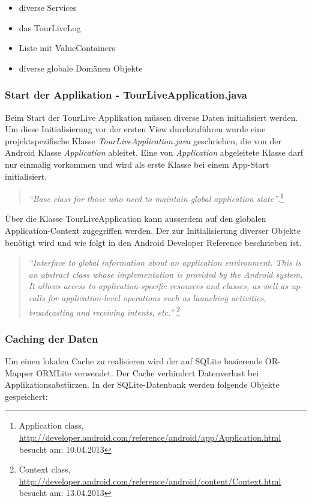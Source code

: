 \begin{itemize} [noitemsep,topsep=0pt]
	\item diverse Services
	\item das TourLiveLog
	\item Liste mit ValueContainers
	\item diverse globale Domänen Objekte
\end{itemize}

\subsubsection{Start der Applikation - TourLiveApplication.java}
Beim Start der TourLive Applikation müssen diverse Daten initialisiert werden. Um diese Initialisierung vor der ersten View durchzuführen wurde eine projektspezifische Klasse \textit{TourLiveApplication.java} geschrieben, die von der Android Klasse \textit{Application} ableitet. Eine von \textit{Application} abgeleitete Klasse darf nur einmalig vorkommen und wird als erste Klasse bei einem App-Start initialisiert.
\begin{quotation}
\textit{``Base class for those who need to maintain global application state''}.\footnote{Application class, \url{http://developer.android.com/reference/android/app/Application.html} besucht am: 10.04.2013}
\end{quotation}
Über die Klasse TourLiveApplication kann ausserdem auf den globalen Application-Context zugegriffen werden. Der zur Initialisierung diverser Objekte benötigt wird und wie folgt in den Android Developer Reference beschrieben ist.
\begin{quotation}
\textit{``Interface to global information about an application environment. This is an abstract class whose implementation is provided by the Android system. It allows access to application-specific resources and classes, as well as up-calls for application-level operations such as launching activities, broadcasting and receiving intents, etc.'' }\footnote{Context class, \url{http://developer.android.com/reference/android/content/Context.html} besucht am: 13.04.2013}
\end{quotation}

\subsubsection{Caching der Daten}
Um einen lokalen Cache zu realisieren wird der auf SQLite basierende OR-Mapper ORMLite verwendet. Der Cache verhindert Datenverlust bei Applikationsabstürzen. In der SQLite-Datenbank werden folgende Objekte gespeichert:


